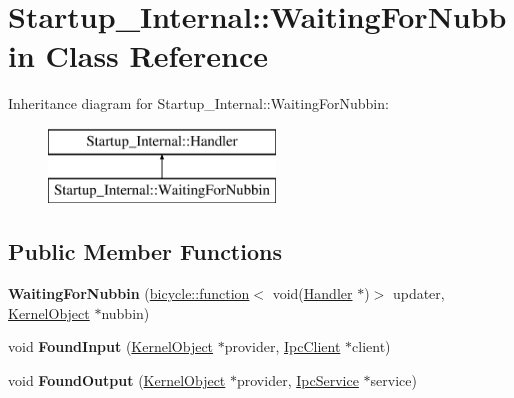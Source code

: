 \hypertarget{class_startup___internal_1_1_waiting_for_nubbin}{}\section{Startup\+\_\+\+Internal\+:\+:Waiting\+For\+Nubbin Class Reference}
\label{class_startup___internal_1_1_waiting_for_nubbin}
Inheritance diagram for Startup\+\_\+\+Internal\+:\+:Waiting\+For\+Nubbin\+:\begin{figure}[H]
\begin{center}
\leavevmode
\includegraphics[height=2.000000cm]{class_startup___internal_1_1_waiting_for_nubbin}
\end{center}
\end{figure}
\subsection*{Public Member Functions}
\begin{DoxyCompactItemize}
\item 
\mbox{\label{class_startup___internal_1_1_waiting_for_nubbin_a9fd9a40fbd21c523343f77b4a9b2a73f}} 
{\bfseries Waiting\+For\+Nubbin} (\hyperlink{classbicycle_1_1function}{bicycle\+::function}$<$ void(\hyperlink{class_startup___internal_1_1_handler}{Handler} $\ast$)$>$ updater, \hyperlink{class_kernel_object}{Kernel\+Object} $\ast$nubbin)
\item 
\mbox{\label{class_startup___internal_1_1_waiting_for_nubbin_a77300a02ce4bf337bbaa44e589fc7dda}} 
void {\bfseries Found\+Input} (\hyperlink{class_kernel_object}{Kernel\+Object} $\ast$provider, \hyperlink{class_ipc_client}{Ipc\+Client} $\ast$client)
\item 
\mbox{\label{class_startup___internal_1_1_waiting_for_nubbin_a1de5e5805e40ed15f0a0d90eecffce06}} 
void {\bfseries Found\+Output} (\hyperlink{class_kernel_object}{Kernel\+Object} $\ast$provider, \hyperlink{class_ipc_service}{Ipc\+Service} $\ast$service)
\end{DoxyCompactItemize}
